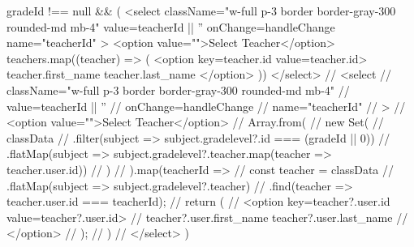 {{          {gradeId !== null && (
              <select
              className="w-full p-3 border border-gray-300 rounded-md mb-4"
              value={teacherId || ''}
              onChange={handleChange}
              name="teacherId"
            >
              <option value="">Select Teacher</option>
              {teachers.map((teacher) => (
                <option key={teacher.id} value={teacher.id}>
                  {teacher.first_name} {teacher.last_name}
                </option>
              ))}
            </select>
            // <select
            //   className="w-full p-3 border border-gray-300 rounded-md mb-4"
            //   value={teacherId || ''}
            //   onChange={handleChange}
            //   name="teacherId"
            // >
            //   <option value="">Select Teacher</option>
            //   {Array.from(
            //     new Set(
            //       classData
            //         .filter(subject => subject.gradelevel?.id === (gradeId || 0))
            //         .flatMap(subject => subject.gradelevel?.teacher.map(teacher => teacher.user.id))
            //     )
            //   ).map(teacherId => {
            //     const teacher = classData
            //       .flatMap(subject => subject.gradelevel?.teacher)
            //       .find(teacher => teacher.user.id === teacherId);
            //     return (
            //       <option key={teacher?.user.id} value={teacher?.user.id}>
            //         {teacher?.user.first_name} {teacher?.user.last_name}
            //       </option>
            //     );
            //   })}
            // </select>
          )}

}}
